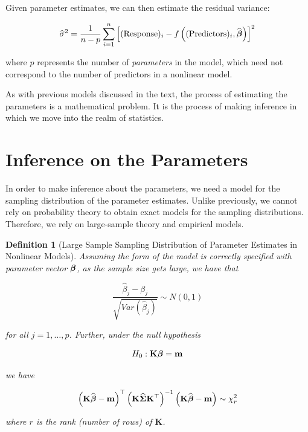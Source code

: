 \documentclass[
]{book}
\theoremstyle{plain}
\theoremstyle{mydefn}
\newtheorem{definition}{Definition}[chapter]
\theoremstyle{myexmpl}
\theoremstyle{remark}
\begin{document}
Given parameter estimates, we can then estimate the residual variance:

\[\widehat{\sigma}^2 = \frac{1}{n-p} \sum\limits_{i=1}^{n} \left[(\text{Response})_i - f\left((\text{Predictors})_i, \widehat{\boldsymbol{\beta}}\right)\right]^2\]

where \(p\) represents the number of \emph{parameters} in the model, which need not correspond to the number of predictors in a nonlinear model.

As with previous models discussed in the text, the process of estimating the parameters is a mathematical problem. It is the process of making inference in which we move into the realm of statistics.

\hypertarget{inference-on-the-parameters}{%
\section{Inference on the Parameters}\label{inference-on-the-parameters}}

In order to make inference about the parameters, we need a model for the sampling distribution of the parameter estimates. Unlike previously, we cannot rely on probability theory to obtain exact models for the sampling distributions. Therefore, we rely on large-sample theory and empirical models.

\begin{definition}[Large Sample Sampling Distribution of Parameter Estimates in Nonlinear Models]
\protect\hypertarget{def:nlm-samp-distns}{}{\label{def:nlm-samp-distns} {} }Assuming the form of the model is correctly specified with parameter vector \(\boldsymbol{\beta}\), as the sample size gets large, we have that

\[\frac{\widehat{\beta}_j - \beta_j}{\sqrt{Var\left(\widehat{\beta}_j\right)}} \sim N(0, 1)\]

for all \(j = 1, \dotsc, p\). Further, under the null hypothesis

\[H_0: \mathbf{K}\boldsymbol{\beta} = \mathbf{m}\]

we have

\[\left(\mathbf{K}\widehat{\boldsymbol{\beta}} - \mathbf{m}\right)^\top \left(\mathbf{K}\widehat{\boldsymbol{\Sigma}}\mathbf{K}^\top\right)^{-1} \left(\mathbf{K}\widehat{\boldsymbol{\beta}} - \mathbf{m}\right) \sim \chi^2_r\]

where \(r\) is the rank (number of rows) of \(\bm{K}\).
\end{definition}
\end{document}
